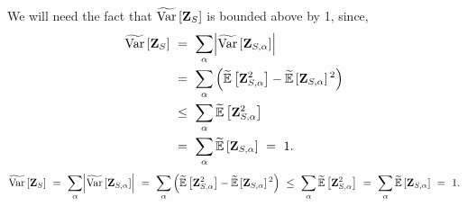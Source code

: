 %
We will need the fact that $\tildeVar{\zee_S}$ is bounded above by 1, since,
%
\ifnum{}
\begin{align*}
\tildeVar{\zee_S} 
&~=~ \sum_{\alpha} \abs*{\tildeVar{\zee_{S,\alpha}}} \\
&~=~ \sum_{\alpha}\inparen{
          \tildeEx{\zee_{S,\alpha}^2} - \tildeEx{\zee_{S,\alpha}}^2} \\
&~\leq~ \sum_{\alpha} \tildeEx{\zee_{S,\alpha}^2} \\
&~=~ \sum_{\alpha} \tildeEx{\zee_{S,\alpha}} 
~=~ 1.
\end{align*}
\else
\[
\tildeVar{\zee_S} 
~=~ \sum_{\alpha} \abs*{\tildeVar{\zee_{S,\alpha}}} 
~=~ \sum_{\alpha}\inparen{
          \tildeEx{\zee_{S,\alpha}^2} - \tildeEx{\zee_{S,\alpha}}^2} 
~\leq~ \sum_{\alpha} \tildeEx{\zee_{S,\alpha}^2} 
~=~ \sum_{\alpha} \tildeEx{\zee_{S,\alpha}} 
~=~ 1.
\]
\fi

%
\vspace{-5 pt}
